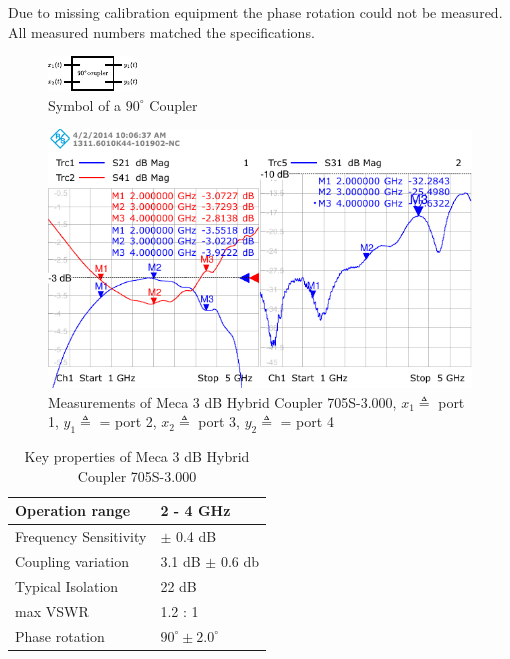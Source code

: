 Due to missing calibration equipment the phase rotation could not be measured.
All measured numbers matched the specifications.

\begin{figure}[p]
  \centering
  \includegraphics{figures/90deg_coupler_symbol}
  \caption{Symbol of a $90^\circ$ Coupler}
  \label{fig:90deg_coupler_symbol}
\end{figure}

\begin{figure}[p]
  \centering
  \includegraphics[width=\textwidth]{figures/network_analyzer/Meca_705S-3_coupler_id1}
  \caption{Measurements of Meca 3 dB Hybrid Coupler 705S-3.000,
    $x_1 \triangleq $ port 1, $y_1 \triangleq $ = port 2,
    $x_2 \triangleq $ port 3, $y_2 \triangleq $ = port 4}
  \label{fig:90deg_coupler_measurement}
\end{figure}

\begin{table}[h]
  \centering
  \begin{tabular}{|l|l|}
    \hline
    Operation range & 2 - 4 GHz \\ \hline
    Frequency Sensitivity & $\pm$ 0.4 dB \\ \hline
    Coupling variation & 3.1 dB $\pm$ 0.6 db \\ \hline
    Typical Isolation & 22 dB \\ \hline
    max \gls{VSWR} & 1.2 : 1 \\ \hline
    Phase rotation & $90^\circ \pm 2.0^\circ$ \\ \hline
  \end{tabular}
  \caption{Key properties of Meca 3 dB Hybrid Coupler 705S-3.000 \cite{meca_705s}}
  \label{tab:awg}
\end{table}

